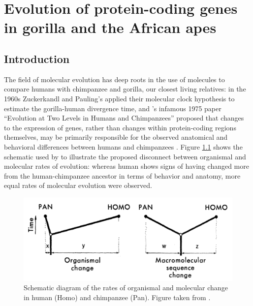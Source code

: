 \chapter{Evolution of protein-coding genes in gorilla and the African apes}
\label{ch_gorilla}

\section{Introduction}

The field of molecular evolution has deep roots in the use of
molecules to compare humans with chimpanzee and gorilla, our closest
living relatives: in the 1960s Zuckerkandl and Pauling's applied their
molecular clock hypothesis to estimate the gorilla-human divergence
time, and \citeauthor{King1975}'s infamous 1975 paper ``Evolution at
Two Levels in Humans and Chimpanzees'' proposed that changes to the
expression of genes, rather than changes within protein-coding regions
themselves, may be primarily responsible for the observed anatomical
and behavioral differences between humans and chimpanzees
\citep{King1975}. Figure \ref{fig_king_wilson} shows the schematic
used by \citeauthor{King1975} to illustrate the proposed disconnect
between organismal and molecular rates of evolution: whereas human
shows signs of having changed more from the human-chimpanzee ancestor
in terms of behavior and anatomy, more equal rates of molecular
evolution were observed.

\begin{figure}
\centering
\includegraphics[scale=0.35]{Figs/king_wilson.pdf}
\caption{Schematic diagram of the rates of organismal and molecular
  change in human (Homo) and chimpanzee (Pan). Figure taken from
  \citet{King1975}.}
\label{fig_king_wilson}
\end{figure}

